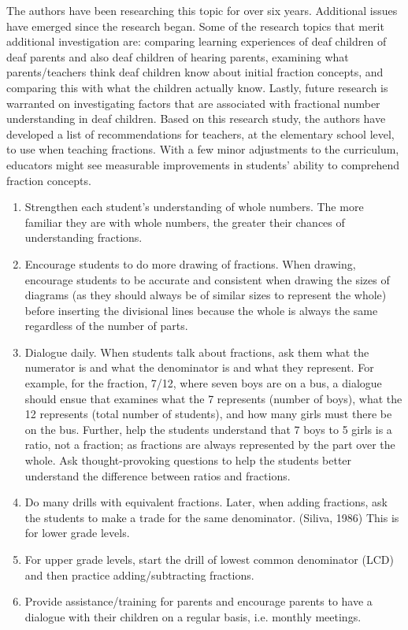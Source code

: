 \documentclass[11.5pt]{sig-alternate} %
\begin{document}
\begin{large}
The authors have been researching this topic for over six years. Additional issues have emerged since the research began.  Some of the research topics that merit additional investigation are: comparing learning experiences of deaf children of deaf parents and also deaf children of hearing parents, examining what parents/teachers think deaf children know about initial fraction concepts, and comparing this with what the children actually know. Lastly, future research is warranted on investigating factors that are associated with fractional number understanding in deaf children. Based on this research study, the authors have developed a list of recommendations for teachers, at the elementary school level, to use when teaching fractions. With a few minor adjustments to the curriculum, educators might see measurable improvements in students’ ability to comprehend fraction concepts.

\begin{enumerate}
     \item Strengthen each student’s understanding of whole numbers. The more familiar they are with whole numbers, the greater their chances of understanding fractions.
     \item Encourage students to do more drawing of fractions. When drawing, encourage students to be accurate and consistent when drawing the sizes of diagrams (as they should always be of similar sizes to represent the whole) before inserting the divisional lines because the whole is always the same regardless of the number of parts.
     \item Dialogue daily. When students talk about fractions, ask them what the numerator is and what the denominator is and what they represent. For example, for the fraction, 7/12, where seven boys are on a bus, a dialogue should ensue that examines what the 7 represents (number of boys), what the 12 represents (total number of students), and how many girls must there be on the bus. Further, help the students understand that 7 boys to 5 girls is a ratio, not a fraction; as fractions are always represented by the part over the whole. Ask thought-provoking questions to help the students better understand the difference between ratios and fractions.
     \item Do many drills with equivalent fractions. Later, when adding fractions, ask the students to make a trade for the same denominator. (Siliva, 1986) This is for lower grade levels.
     \item For upper grade levels, start the drill of lowest common denominator (LCD) and then practice adding/subtracting fractions.
     \item Provide assistance/training for parents and encourage parents to have a dialogue with their children on a regular basis, i.e. monthly meetings.
\end{enumerate}
 

\end{large}
\end{document}
